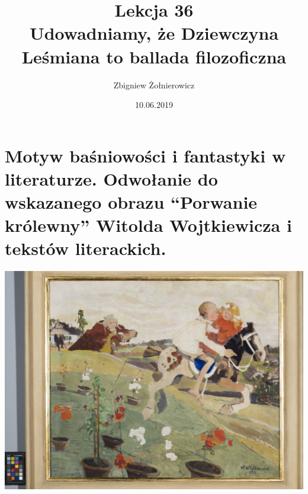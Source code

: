 \documentclass[a4paper]{article}
\begin{document}
\title{
        {\huge Lekcja 36} \\
        {\large Udowadniamy, że Dziewczyna Leśmiana to ballada filozoficzna}
}
\author{Zbigniew Żołnierowicz}
\date{10.06.2019}
\maketitle
\section{Motyw baśniowości i fantastyki w literaturze. Odwołanie do wskazanego obrazu ``Porwanie królewny'' Witolda Wojtkiewicza i tekstów literackich.}
\includegraphics[width=\textwidth]{porwaniekrolewny.jpg}
\end{document}
